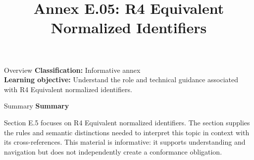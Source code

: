 \documentclass[10pt,letterpaper]{article}
\title{Annex E.05: R4 Equivalent Normalized Identifiers}
\author{}
\date{}
\begin{document}
\maketitle
\begin{CornellOverviewBox}{Overview}
\textbf{Classification:} Informative annex\\[2pt]
\textbf{Learning objective:} Understand the role and technical guidance associated with R4 Equivalent normalized identifiers.
\end{CornellOverviewBox}\begin{CornellSummaryBox}{Summary}
{\sffamily\bfseries\color{Accent} Summary}\par\vspace{3pt}Section E.5 focuses on R4 Equivalent normalized identifiers. The section supplies the rules and semantic distinctions needed to interpret this topic in context with its cross-references. This material is informative: it supports understanding and navigation but does not independently create a conformance obligation.
\end{CornellSummaryBox}
\end{document}
